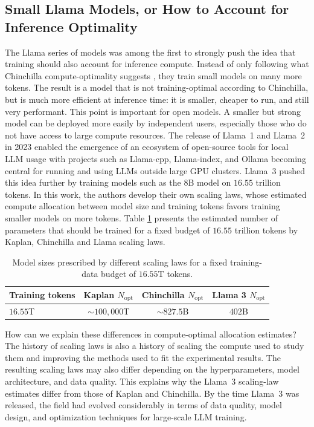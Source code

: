 \subsection{Small Llama Models, or How to Account for Inference Optimality}
The Llama series of models \citep{touvron2023llamaopenefficientfoundation, touvron2023llama2openfoundation, grattafiori2024llama3herdmodels}
was among the first to strongly push the idea that
training should also account for inference compute. Instead of only following what
Chinchilla compute-optimality suggests \citep{hoffmann2022training}, they train small models on many more
tokens. The result is a model that is not training-optimal according to Chinchilla, 
but is much more efficient at inference time: it is smaller, cheaper to run, and still very performant.
This point is important for open models. A smaller but strong model can be deployed more
easily by independent users, especially those who do not have access to large compute
resources. The release of Llama~1 \citep{touvron2023llamaopenefficientfoundation}
and Llama~2 \citep{touvron2023llama2openfoundation} in 2023 enabled the emergence of 
an ecosystem of open-source tools for local LLM usage with projects such as Llama-cpp, Llama-index,
and Ollama becoming central for running and using LLMs outside large GPU clusters.
Llama~3 \citep{grattafiori2024llama3herdmodels} pushed this idea further by training models such as the 8B model on
$16.55$ trillion tokens. In this work, the authors develop their own scaling laws, whose
estimated compute allocation between model size and training tokens favors
training smaller models on more tokens. Table \ref{tab:llama_scaling} presents
the estimated number of parameters that should be trained for a fixed budget
of $16.55$ trillion tokens by Kaplan, Chinchilla and Llama scaling laws.

\begin{table}[t]
    \centering
    \caption{Model sizes prescribed by different scaling laws for a fixed
    training-data budget of $16.55$T tokens.}
    \label{tab:llama_scaling}
    \begin{tabular}{lccc}
        \toprule
        Training tokens
        & Kaplan $N_{\mathrm{opt}}$
        & Chinchilla $N_{\mathrm{opt}}$
        & Llama 3 $N_{\mathrm{opt}}$ \\
        \midrule
        $16.55$T
        & $\sim 100,000$T
        & $\sim827.5$B
        & $402$B \\
        \bottomrule
    \end{tabular}
\end{table}
How can we explain these differences in compute-optimal allocation estimates?
The history of scaling laws is also a history of scaling the compute used to study them 
and improving the methods used to fit the experimental results. 
The resulting scaling laws may also differ depending on the hyperparameters, 
model architecture, and data quality.
This explains why the Llama~3 scaling-law estimates differ from those of Kaplan and Chinchilla. 
By the time Llama~3 was released, the field had evolved considerably in terms of data quality, 
model design, and optimization techniques for large-scale LLM training.

